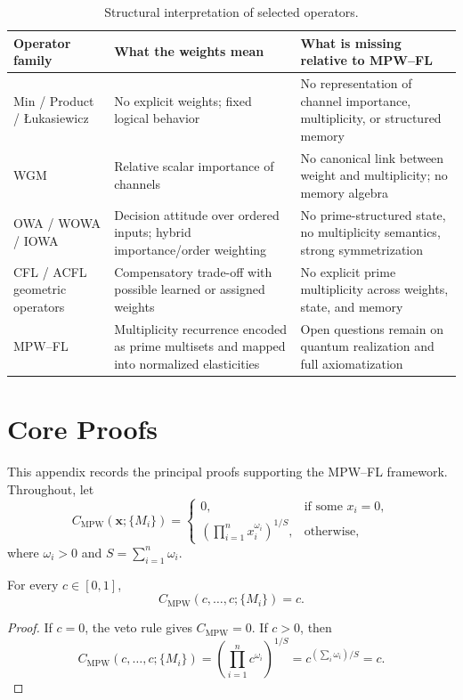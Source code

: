 \documentclass[11pt]{article}
\begin{document}
\begin{table}[ht]
\centering
\caption{Structural interpretation of selected operators.}
\label{tab:comparison-interpretation}
\begin{tabular}{p{3.0cm}p{4.8cm}p{5.2cm}}
\hline
\textbf{Operator family} & \textbf{What the weights mean} & \textbf{What is missing relative to MPW--FL} \\
\hline
Min / Product / \L{}ukasiewicz &
No explicit weights; fixed logical behavior &
No representation of channel importance, multiplicity, or structured memory \\
WGM &
Relative scalar importance of channels &
No canonical link between weight and multiplicity; no memory algebra \\
OWA / WOWA / IOWA &
Decision attitude over ordered inputs; hybrid importance/order weighting &
No prime-structured state, no multiplicity semantics, strong symmetrization \\
CFL / ACFL geometric operators &
Compensatory trade-off with possible learned or assigned weights &
No explicit prime multiplicity across weights, state, and memory \\
MPW--FL &
Multiplicity recurrence encoded as prime multisets and mapped into normalized elasticities &
Open questions remain on quantum realization and full axiomatization \\
\hline
\end{tabular}
\end{table}

\section{Core Proofs}
\label{app:proofs}

This appendix records the principal proofs supporting the MPW--FL framework. Throughout, let
\[
  C_{\mathrm{MPW}}(\mathbf{x};\{M_i\})
  =
  \begin{cases}
    0, & \text{if some } x_i = 0, \\[4pt]
    \left(\prod_{i=1}^n x_i^{\omega_i}\right)^{1/S}, & \text{otherwise},
  \end{cases}
\]
where $\omega_i > 0$ and $S = \sum_{i=1}^n \omega_i$.

\begin{proposition}
\label{prop:idempotence}
For every $c \in [0,1]$,
\[
  C_{\mathrm{MPW}}(c,\dots,c;\{M_i\}) = c.
\]
\end{proposition}

\begin{proof}
If $c=0$, the veto rule gives $C_{\mathrm{MPW}} = 0$. If $c>0$, then
\[
  C_{\mathrm{MPW}}(c,\dots,c;\{M_i\})
  = \left(\prod_{i=1}^n c^{\omega_i}\right)^{1/S}
  = c^{(\sum_i \omega_i)/S}
  = c.
\]
\end{proof}
\end{document}

